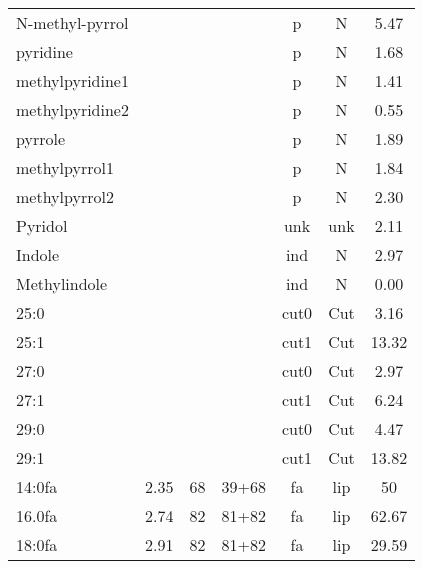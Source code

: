 \begin{table*}
\begin{center}
\begin{tabular}{lcccccc}
N-methyl-pyrrol&&&&p&N&5.47\\
pyridine&&&&p&N&1.68\\
methylpyridine1&&&&p&N&1.41\\
methylpyridine2&&&&p&N&0.55\\
pyrrole&&&&p&N&1.89\\
methylpyrrol1&&&&p&N&1.84\\
methylpyrrol2&&&&p&N&2.30\\
Pyridol&&&&unk&unk&2.11\\
Indole&&&&ind&N&2.97\\
Methylindole&&&&ind&N&0.00\\
25:0&&&&cut0&Cut&3.16\\
25:1&&&&cut1&Cut&13.32\\
27:0&&&&cut0&Cut&2.97\\
27:1&&&&cut1&Cut&6.24\\
29:0&&&&cut0&Cut&4.47\\
29:1&&&&cut1&Cut&13.82\\
14:0fa&2.35&68&39+68&fa&lip&50\\
16.0fa&2.74&82&81+82&fa&lip&62.67\\
18:0fa&2.91&82&81+82&fa&lip&29.59\\

\hline
\end{tabular}
\end{center}
\label{tab:pyrprod2}
\end{table*}


